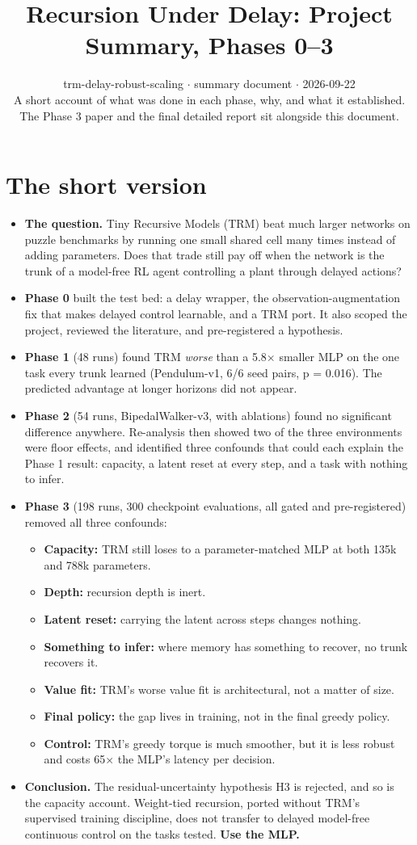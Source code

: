 \documentclass[11pt]{article}
\title{Recursion Under Delay: Project Summary, Phases 0--3}
\author{}
\date{trm-delay-robust-scaling $\cdot$ summary document $\cdot$ 2026-09-22\\[2pt]A short account of what was done in each phase, why, and what it established. The Phase 3 paper and the final detailed report sit alongside this document.}
\begin{document}
\maketitle
\section*{The short version}



\begin{itemize}
\item \textbf{The question.} Tiny Recursive Models (TRM) beat much larger networks on puzzle benchmarks by running one small shared cell many times instead of adding parameters. Does that trade still pay off when the network is the trunk of a model-free RL agent controlling a plant through delayed actions?
\item \textbf{Phase 0} built the test bed: a delay wrapper, the observation-augmentation fix that makes delayed control learnable, and a TRM port. It also scoped the project, reviewed the literature, and pre-registered a hypothesis.
\item \textbf{Phase 1} (48 runs) found TRM \emph{worse} than a 5.8$\times$ smaller MLP on the one task every trunk learned (Pendulum-v1, 6/6 seed pairs, p = 0.016). The predicted advantage at longer horizons did not appear.
\item \textbf{Phase 2} (54 runs, BipedalWalker-v3, with ablations) found no significant difference anywhere. Re-analysis then showed two of the three environments were floor effects, and identified three confounds that could each explain the Phase 1 result: capacity, a latent reset at every step, and a task with nothing to infer.
\item \textbf{Phase 3} (198 runs, 300 checkpoint evaluations, all gated and pre-registered) removed all three confounds:
\begin{itemize}
\item \textbf{Capacity:} TRM still loses to a parameter-matched MLP at both 135k and 788k parameters.
\item \textbf{Depth:} recursion depth is inert.
\item \textbf{Latent reset:} carrying the latent across steps changes nothing.
\item \textbf{Something to infer:} where memory has something to recover, no trunk recovers it.
\item \textbf{Value fit:} TRM's worse value fit is architectural, not a matter of size.
\item \textbf{Final policy:} the gap lives in training, not in the final greedy policy.
\item \textbf{Control:} TRM's greedy torque is much smoother, but it is less robust and costs 65$\times$ the MLP's latency per decision.
\end{itemize}
\item \textbf{Conclusion.} The residual-uncertainty hypothesis H3 is rejected, and so is the capacity account. Weight-tied recursion, ported without TRM's supervised training discipline, does not transfer to delayed model-free continuous control on the tasks tested. \textbf{Use the MLP.}
\end{itemize}
\end{document}
